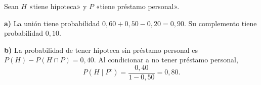 Sean $H$ «tiene hipoteca» y $P$ «tiene préstamo personal».

\textbf{a)} La unión tiene probabilidad $0{,}60+0{,}50-0{,}20=0{,}90$. Su complemento tiene probabilidad $\boxed{0{,}10}$.

\textbf{b)} La probabilidad de tener hipoteca sin préstamo personal es $P(H)-P(H\cap P)=0{,}40$. Al condicionar a no tener préstamo personal,
\[
P(H\mid P^c)=\frac{0{,}40}{1-0{,}50}=\boxed{0{,}80}.
\]
